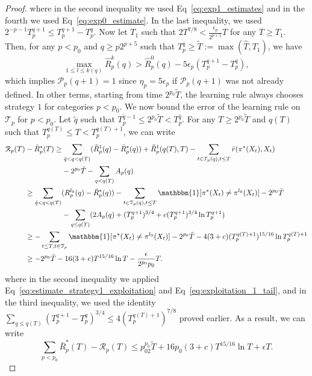 \documentclass[aos]{imsart}
\theoremstyle{plain}
\theoremstyle{remark}
\newcommand{\Pcal}{\mathcal{P}}
\newcommand{\Rcal}{\mathcal{R}}
\newcommand{\Tcal}{\mathcal{T}}
\newcommand{\1}{\mathbbm{1}}%
\begin{document}
\begin{proof}
where in the second inequality we used Eq~\eqref{eq:exp1_estimates} and in the fourth we used Eq~\eqref{eq:exp0_estimate}. In the last inequality, we used $2^{-p-1}T_p^{q+1}\leq T_p^{q+1}-T_p^q$. Now let $T_1$ such that $2T^{7/8}< \frac{\epsilon_p}{2^{p+1}}T$ for any $T\geq T_1$. Then, for any $p<p_0$ and $q\geq p2^{p+5}$ such that $T^q_p\geq \tilde T:=\max(\hat T,T_1)$, we have 
\begin{equation*}
    \max_{1\leq l\leq k(q)} \hat R_p^k(q) > \hat R_p^0(q) -5\epsilon_p (T_p^{q+1}-T_p^q),
\end{equation*}
which implies $\Pcal_p(q+1)=1$ since $\eta_p=5\epsilon_p$ if $\Pcal_p(q+1)$ was not already defined. In other terms, starting from time $2^{p_0}\tilde T$, the learning rule always chooses strategy $1$ for categories $p<p_0$. We now bound the error of the learning rule on $\Tcal_p$ for $p<p_0$. Let $\tilde q$ such that $T^{\tilde q-1}_p\leq 2^{p_0}\tilde T<T^{\hat q}_p$. For any $T\geq  2^{p_0}\tilde T$ and $q(T)$ such that $T^{q(T)}_p\leq T<T^{q(T)+1}_p$, we can write
\begin{align*}
    \Rcal_p(T) &- \bar R_p^*(T) \geq  \sum_{\tilde q<q<q(T)} (\tilde R^1_p(q) - \bar R^*_p(q)) + \tilde R^1_p(q(T),T) - \sum_{t\in\Tcal_p(q),t\leq T}\bar r(\pi^*(X_t), X_t)\\
    &\quad\quad\quad\quad\quad - 2^{p_0}\tilde T -\sum_{q<q(T)}A_p(q) \\
    &\geq  \sum_{\tilde q<q<q(T)} ( R^{l_0}_p(q) - \bar R^*_p(q))  - \sum_{t\in\Tcal_p(q),t\leq T}\1[\pi^*(X_t)\neq \pi^{l_0}(X_t)] - 2^{p_0}\tilde T  \\
    &\quad\quad\quad\quad\quad -\sum_{q\leq q(T)}(2A_p(q)+(T_p^{q+1})^{3/4}+c(T_p^{q+1})^{3/4} \ln T_p^{q+1} )\\
    &\geq - \sum_{t\leq T,t\in\Tcal_p} \1[\pi^*(X_t)\neq \pi^{l_0}(X_t)] -2^{p_0}\tilde T-4(3+c)(T_p^{q(T)+1})^{15/16}\ln T_p^{q(T)+1} \\
    &\geq -2^{p_0}\tilde T-16(3+c)T^{15/16}\ln T -\frac{\epsilon}{2^{p_0}p_0}T.
\end{align*}
where in the second inequality we applied Eq~\eqref{eq:estimate_strategy1_exploitation} and Eq~\eqref{eq:exploitation_1_tail}, and in the third inequality, we used the identity $\sum_{q\leq q(T)} (T^{q+1}_p-T^q_p)^{3/4}\leq 4(T^{q(T)+1}_p)^{7/8}$ proved earlier. As a result, we can write
\begin{equation*}
    \sum_{p<p_0} \bar R_p^*(T) - \Rcal_p(T)\leq p_02^{p_0}\tilde T + 16p_0(3+c)T^{15/16}\ln T + \epsilon T.
\end{equation*}

\end{proof}
\end{document}
